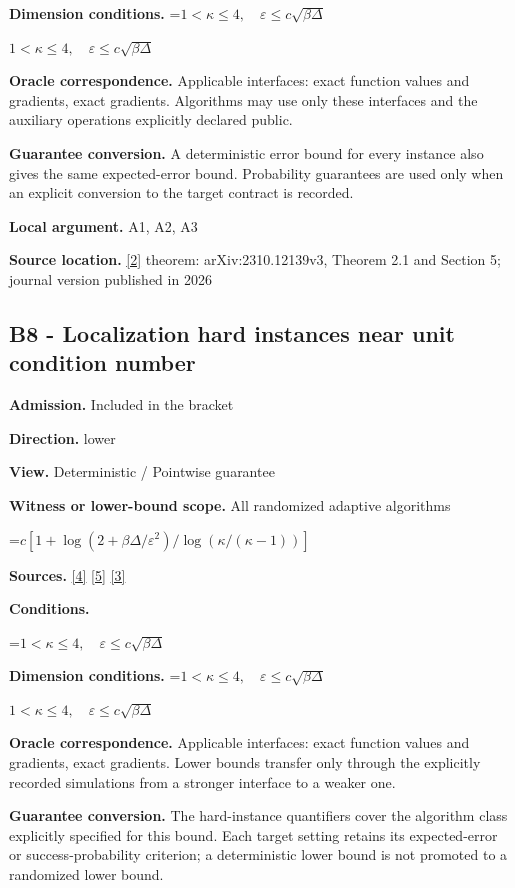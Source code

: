 \documentclass[10pt,a4paper]{article}
\newcommand{\AtlasMath}[1]{\par\begingroup\centering\setbox0=\hbox{$\displaystyle #1$}\ifdim\wd0>1.4\linewidth\typeout{ATLAS WIDE FORMULA: \the\wd0}\fi\ifdim\wd0>\linewidth\resizebox{\linewidth}{!}{\box0}\else\box0\fi\par\endgroup}
\newcommand{\AtlasInlineMath}[1]{\begingroup\setbox0=\hbox{$#1$}\ifdim\wd0>.4\linewidth\endgroup\AtlasMath{#1}\else\endgroup$#1$\fi}
\begin{document}
\textbf{Dimension conditions.} \AtlasInlineMath{1<\kappa\le4,\quad\varepsilon\le c\sqrt{\beta\Delta}}

\textbf{Oracle correspondence.} Applicable interfaces: exact function values and gradients, exact gradients. Algorithms may use only these interfaces and the auxiliary operations explicitly declared public.

\textbf{Guarantee conversion.} A deterministic error bound for every instance also gives the same expected-error bound. Probability guarantees are used only when an explicit conversion to the target contract is recorded.

\textbf{Local argument.} A1, A2, A3

\textbf{Source location.} \href{https://doi.org/10.1007/s10107-026-02352-2}{[2]} theorem: arXiv:2310.12139v3, Theorem 2.1 and Section 5; journal version published in 2026

\subsection{B8 - Localization hard instances near unit condition number}
\textbf{Admission.} Included in the bracket

\textbf{Direction.} lower

\textbf{View.} Deterministic / Pointwise guarantee

\textbf{Witness or lower-bound scope.} All randomized adaptive algorithms

\AtlasMath{c[1+\log(2+\beta\Delta/\varepsilon^2)/\log(\kappa/(\kappa-1))]}
\textbf{Sources.} \href{https://arxiv.org/pdf/2101.09740v2}{[4]} \href{https://arxiv.org/pdf/2609.33360v2}{[5]} \href{https://arxiv.org/pdf/2609.10874}{[3]}

\textbf{Conditions.} 
\AtlasMath{1<\kappa\le4,\quad\varepsilon\le c\sqrt{\beta\Delta}}


\textbf{Dimension conditions.} \AtlasInlineMath{1<\kappa\le4,\quad\varepsilon\le c\sqrt{\beta\Delta}}

\textbf{Oracle correspondence.} Applicable interfaces: exact function values and gradients, exact gradients. Lower bounds transfer only through the explicitly recorded simulations from a stronger interface to a weaker one.

\textbf{Guarantee conversion.} The hard-instance quantifiers cover the algorithm class explicitly specified for this bound. Each target setting retains its expected-error or success-probability criterion; a deterministic lower bound is not promoted to a randomized lower bound.
\end{document}
